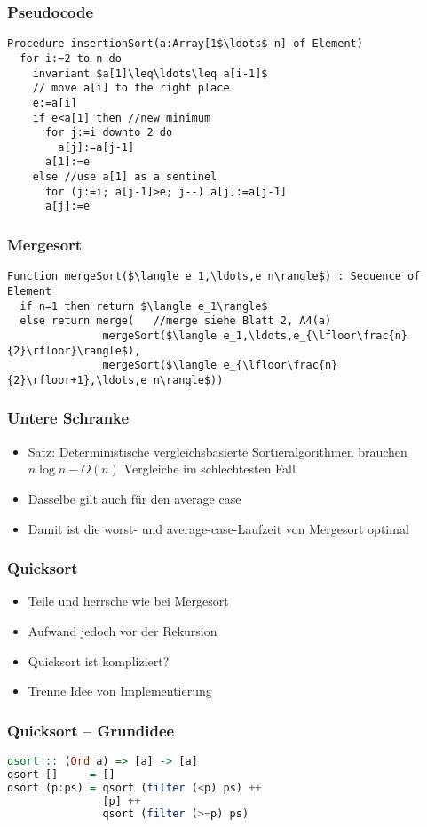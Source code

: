 \begin{frame}[fragile]
\frametitle{Pseudocode}
\begin{lstlisting}
Procedure insertionSort(a:Array[1$\ldots$ n] of Element)
  for i:=2 to n do
    invariant $a[1]\leq\ldots\leq a[i-1]$
    // move a[i] to the right place
    e:=a[i]
    if e<a[1] then //new minimum
      for j:=i downto 2 do
        a[j]:=a[j-1]
      a[1]:=e
    else //use a[1] as a sentinel
      for (j:=i; a[j-1]>e; j--) a[j]:=a[j-1]
      a[j]:=e
\end{lstlisting}
\end{frame}

\begin{frame}[fragile]
\frametitle{Mergesort}
\begin{lstlisting}
Function mergeSort($\langle e_1,\ldots,e_n\rangle$) : Sequence of Element
  if n=1 then return $\langle e_1\rangle$
  else return merge(   //merge siehe Blatt 2, A4(a)
               mergeSort($\langle e_1,\ldots,e_{\lfloor\frac{n}{2}\rfloor}\rangle$),
               mergeSort($\langle e_{\lfloor\frac{n}{2}\rfloor+1},\ldots,e_n\rangle$))
\end{lstlisting}
\end{frame}

\begin{frame}
\frametitle{Untere Schranke}
\begin{itemize}
\item Satz: Deterministische vergleichsbasierte Sortieralgorithmen brauchen $n\log n-O(n)$ Vergleiche im schlechtesten Fall.\pause
\item Dasselbe gilt auch für den average case\pause
\item Damit ist die worst- und average-case-Laufzeit von Mergesort optimal
\end{itemize}
\end{frame}

\begin{frame}
\frametitle{Quicksort}
\begin{itemize}
\item Teile und herrsche wie bei Mergesort
\item Aufwand jedoch vor der Rekursion\pause
\item Quicksort ist kompliziert?\pause
\item Trenne Idee von Implementierung
\end{itemize}
\end{frame}

\begin{frame}[fragile]
\frametitle{Quicksort -- Grundidee}
\begin{lstlisting}[language=Haskell]
qsort :: (Ord a) => [a] -> [a]
qsort []     = []
qsort (p:ps) = qsort (filter (<p) ps) ++
               [p] ++
               qsort (filter (>=p) ps)
\end{lstlisting}
\end{frame}

